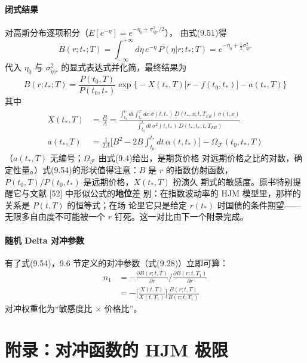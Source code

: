 \paragraph{闭式结果}
对高斯分布逐项积分（$E[e^{-\eta}]=e^{-\eta_0+\sigma_{\eta|r}^2/2}$），
由式(9.51)得
\begin{equation*}
B(r;t_*;T)=\int_{-\infty}^{+\infty}d\eta\,e^{-\eta}\,P(\eta|r;t_*;T)
=e^{-\eta_0+\frac{1}{2}\sigma_{\eta|r}^{2}}\tag{9.53}
\end{equation*}
代入 $\eta_0$ 与 $\sigma_{\eta|r}^{2}$ 的显式表达式并化简，最终结果为
\begin{equation*}
B(r;t_*;T)=\frac{P(t_0,T)}{P(t_0,t_*)}
\exp\bigl\{-X(t_*,T)\bigl[r-f(t_0,t_*)\bigr]-a(t_*,T)\bigr\}\tag{9.54}
\end{equation*}
其中
\begin{align*}
X(t_*,T)&=\frac{B}{A}=\frac{\int_{t_0}^{t_*}dt\int_{t_*}^{T}dx\,
\sigma(t,t_*)\,D(t_*,x;t,T_{FR})\,\sigma(t,x)}
{\int_{t_0}^{t_*}dt\,\sigma^2(t,t_*)\,D(t_*,t_*;t,T_{FR})}\tag{9.55}\\
a(t_*,T)&=\frac{1}{2A}\biggl[B^2-2B\int_{t_0}^{t_*}dt\,\alpha(t,t_*)\biggr]
-\Omega_{\mathcal{F}}(t_0,t_*,T)
\end{align*}
（$a(t_*,T)$ 无编号；$\Omega_{\mathcal{F}}$ 由式(9.4)给出，是期货价格
对远期价格之比的对数，确定性量。）式(9.54)的形状值得注意：$B$ 是 $r$
的指数仿射函数，$P(t_0,T)/P(t_0,t_*)$ 是远期价格，$X(t_*,T)$ 扮演久
期式的敏感度。原书特别提醒它与文献 [52] 中形似公式的\textbf{地位}差
别：在指数波动率的 HJM 模型里，那样的关系是 $P(t,T)$ 的恒等式；在场
论里它只是给定 $r(t_*)$ 时国债的条件期望——无限多自由度不可能被一个
$r$ 钉死。这一对比由下一个附录完成。

\paragraph{随机 Delta 对冲参数}
有了式(9.54)，9.6 节定义的对冲参数（式(9.28)）立即可算：
\begin{align*}
n_1&=-\frac{\partial B(r;t,T)}{\partial r}\bigg/
\frac{\partial B(r;t,T_1)}{\partial r}\\
&=-\biggl[\frac{X(t,T)}{X(t,T_1)}\biggr]\frac{B(r;t,T)}{B(r;t,T_1)}
\tag{9.56}
\end{align*}
对冲权重化为“敏感度比 $\times$ 价格比”。

\section{附录：对冲函数的 HJM 极限}

